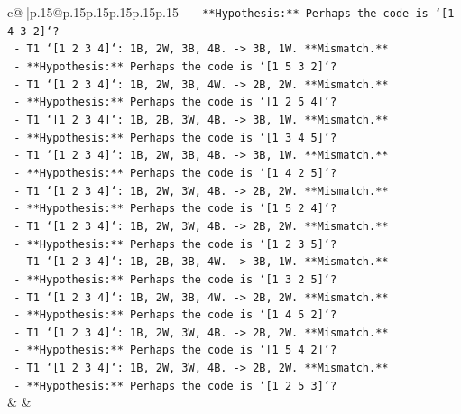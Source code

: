 \documentclass{article}
\begin{document}
{\begin{supertabular}{c@{$\;$}|p{.15\linewidth}@{}p{.15\linewidth}p{.15\linewidth}p{.15\linewidth}p{.15\linewidth}p{.15\linewidth}}
{{{\texttt{              {-} **Hypothesis:** Perhaps the code is `{[}1 4 3 2{]}`?} \\
\texttt{                {-} T1 `{[}1 2 3 4{]}`: 1B, 2W, 3B, 4B. {-}> 3B, 1W. **Mismatch.**} \\
\texttt{              {-} **Hypothesis:** Perhaps the code is `{[}1 5 3 2{]}`?} \\
\texttt{                {-} T1 `{[}1 2 3 4{]}`: 1B, 2W, 3B, 4W. {-}> 2B, 2W. **Mismatch.**} \\
\texttt{              {-} **Hypothesis:** Perhaps the code is `{[}1 2 5 4{]}`?} \\
\texttt{                {-} T1 `{[}1 2 3 4{]}`: 1B, 2B, 3W, 4B. {-}> 3B, 1W. **Mismatch.**} \\
\texttt{              {-} **Hypothesis:** Perhaps the code is `{[}1 3 4 5{]}`?} \\
\texttt{                {-} T1 `{[}1 2 3 4{]}`: 1B, 2W, 3B, 4B. {-}> 3B, 1W. **Mismatch.**} \\
\texttt{              {-} **Hypothesis:** Perhaps the code is `{[}1 4 2 5{]}`?} \\
\texttt{                {-} T1 `{[}1 2 3 4{]}`: 1B, 2W, 3W, 4B. {-}> 2B, 2W. **Mismatch.**} \\
\texttt{              {-} **Hypothesis:** Perhaps the code is `{[}1 5 2 4{]}`?} \\
\texttt{                {-} T1 `{[}1 2 3 4{]}`: 1B, 2W, 3W, 4B. {-}> 2B, 2W. **Mismatch.**} \\
\texttt{              {-} **Hypothesis:** Perhaps the code is `{[}1 2 3 5{]}`?} \\
\texttt{                {-} T1 `{[}1 2 3 4{]}`: 1B, 2B, 3B, 4W. {-}> 3B, 1W. **Mismatch.**} \\
\texttt{              {-} **Hypothesis:** Perhaps the code is `{[}1 3 2 5{]}`?} \\
\texttt{                {-} T1 `{[}1 2 3 4{]}`: 1B, 2W, 3B, 4W. {-}> 2B, 2W. **Mismatch.**} \\
\texttt{              {-} **Hypothesis:** Perhaps the code is `{[}1 4 5 2{]}`?} \\
\texttt{                {-} T1 `{[}1 2 3 4{]}`: 1B, 2W, 3W, 4B. {-}> 2B, 2W. **Mismatch.**} \\
\texttt{              {-} **Hypothesis:** Perhaps the code is `{[}1 5 4 2{]}`?} \\
\texttt{                {-} T1 `{[}1 2 3 4{]}`: 1B, 2W, 3W, 4B. {-}> 2B, 2W. **Mismatch.**} \\
\texttt{              {-} **Hypothesis:** Perhaps the code is `{[}1 2 5 3{]}`?} \\
            }
        }
    }
    & & \\ \\


\end{supertabular}}
\end{document}
